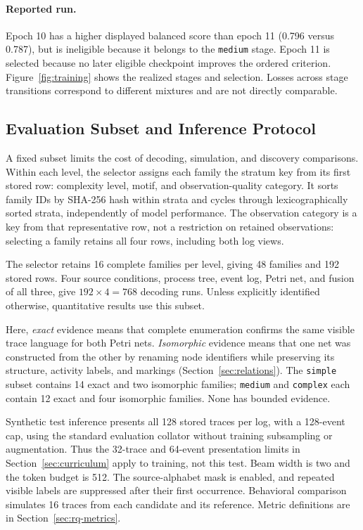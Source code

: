 \documentclass[mathematics,article,submit,moreauthors]{Definitions/mdpi}
\begin{document}
\paragraph{Reported run.}
Epoch 10 has a higher displayed balanced score than epoch 11 (0.796 versus 0.787), but is ineligible because it belongs to the \texttt{medium} stage. Epoch 11 is selected because no later eligible checkpoint improves the ordered criterion. Figure~\ref{fig:training} shows the realized stages and selection. Losses across stage transitions correspond to different mixtures and are not directly comparable.



\FloatBarrier
\subsection{Evaluation Subset and Inference Protocol}\label{sec:fixed-evaluation}

A fixed subset limits the cost of decoding, simulation, and discovery comparisons. Within each level, the selector assigns each family the stratum key from its first stored row: complexity level, motif, and observation-quality category. It sorts family IDs by SHA-256 hash within strata and cycles through lexicographically sorted strata, independently of model performance. The observation category is a key from that representative row, not a restriction on retained observations: selecting a family retains all four rows, including both log views.

The selector retains 16 complete families per level, giving 48 families and 192 stored rows. Four source conditions, process tree, event log, Petri net, and fusion of all three, give $192\times4=768$ decoding runs. Unless explicitly identified otherwise, quantitative results use this subset.

Here, \emph{exact} evidence means that complete enumeration confirms the same visible trace language for both Petri nets. \emph{Isomorphic} evidence means that one net was constructed from the other by renaming node identifiers while preserving its structure, activity labels, and markings (Section~\ref{sec:relations}). The \texttt{simple} subset contains 14 exact and two isomorphic families; \texttt{medium} and \texttt{complex} each contain 12 exact and four isomorphic families. None has bounded evidence.

Synthetic test inference presents all 128 stored traces per log, with a 128-event cap, using the standard evaluation collator without training subsampling or augmentation. Thus the 32-trace and 64-event presentation limits in Section~\ref{sec:curriculum} apply to training, not this test. Beam width is two and the token budget is 512. The source-alphabet mask is enabled, and repeated visible labels are suppressed after their first occurrence. Behavioral comparison simulates 16 traces from each candidate and its reference. Metric definitions are in Section~\ref{sec:rq-metrics}.
\end{document}
